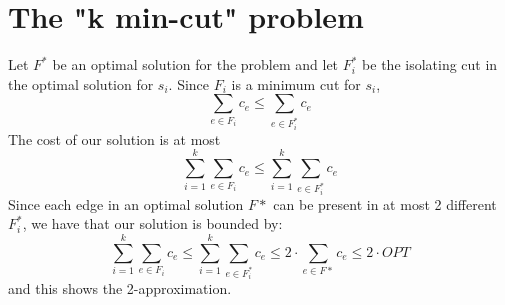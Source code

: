\section{The "k min-cut" problem}

Let $F^*$ be an optimal solution for the problem and let $F^*_i$ be the isolating cut in the optimal solution for $s_i$. Since $F_i$ is a minimum cut for $s_i$, 
\[
\sum_{e \in F_i} c_e \leq \sum_{e \in F^*_i} c_e
\]
The cost of our solution is at most
\[
\sum_{i=1}^{k} \sum_{e \in F_i} c_e \leq \sum_{i=1}^{k} \sum_{e \in F^*_i} c_e
\]
Since each edge in an optimal solution $F*$ can be present in at most 2 different $F^*_i$, we have that our solution is bounded by:
\[
\sum_{i=1}^{k} \sum_{e \in F_i} c_e \leq \sum_{i=1}^{k} \sum_{e \in F^*_i} c_e \leq 2 \cdot \sum_{e \in F*} c_e \leq 2 \cdot OPT
\]
and this shows the 2-approximation.